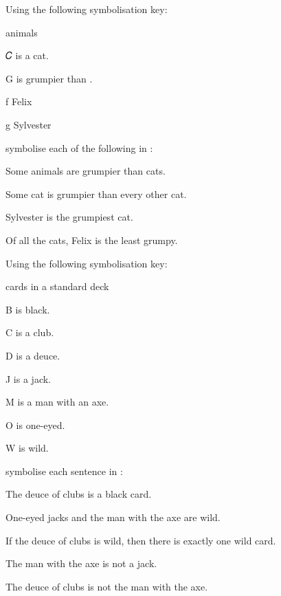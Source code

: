 \problempart
Using the following symbolisation key:
\begin{ekey}
\item[\text{domain}] animals
\item[𝐶\meta{x}]  is a cat.
\item[G]  is grumpier than .
\item[f] Felix 
\item[g] Sylvester
\end{ekey}
symbolise each of the following in \FOL:
\begin{earg}
\item  Some animals are grumpier than cats.
\item Some cat is grumpier than every other cat.
\item Sylvester is the grumpiest cat.
\item Of all the cats, Felix is the least grumpy.
\end{earg}

\problempart
\label{pr.FOLcards}
Using the following symbolisation key:
\begin{ekey}
\item[\text{domain}] cards in a standard deck
\item[B]  is black.
\item[C]  is a club.
\item[D]  is a deuce.
\item[J]  is a jack.
\item[M]  is a man with an axe.
\item[O]  is one-eyed.
\item[W]  is wild.
\end{ekey}
symbolise each sentence in \FOL:
\begin{earg}
\item The deuce of clubs is a black card.
\item One-eyed jacks and the man with the axe are wild.
\item If the deuce of clubs is wild, then there is exactly one wild card.
\item The man with the axe is not a jack.
\item The deuce of clubs is not the man with the axe.
\end{earg}


